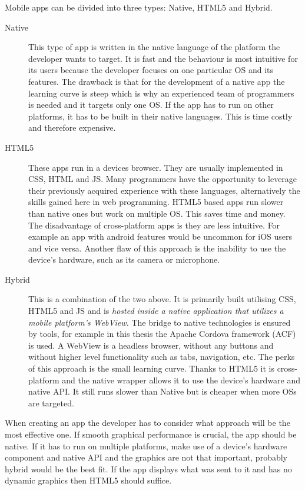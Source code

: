 Mobile apps can be divided into three types: Native, HTML5 and Hybrid.
\begin {description}
\item [Native] This type of app is written in the native language of the platform the developer wants to target. It is fast and the behaviour is most intuitive for its users because the developer focuses on one particular OS and its features. The drawback is that for the development of a native app the learning curve is steep which is why an experienced team of programmers is needed and it targets only one OS. If the app has to run on other platforms, it has to be built in their native languages. This is time costly and therefore expensive. 
\item [HTML5] These apps run in a devices browser. They are usually implemented in CSS, HTML and JS. Many programmers have the opportunity to leverage their previously acquired experience with these languages, alternatively the skills gained here in web programming. HTML5 based apps run slower than native ones but work on multiple OS. This saves time and money. The disadvantage of cross-platform apps is they are less intuitive. For example an app with android features would be uncommon for iOS users and vice versa. Another flaw of this approach is the inability to use the device's hardware, such as its camera or microphone.
\item [Hybrid] This is a combination of the two above. It is primarily built utilising CSS, HTML5 and JS and is \textit{hosted inside a native application that utilizes a mobile platform’s WebView.} \cite{hybrid-mobile-app} The bridge to native technologies is ensured by tools, for example in this thesis the Apache Cordova framework (ACF) is used. A WebView is a headless browser, without any buttons and without higher level functionality such as tabs, navigation, etc. The perks of this approach is the small learning curve. Thanks to HTML5 it is cross-platform and the native wrapper allows it to use the device's hardware and native API. It still runs slower than Native but is cheaper when more OSs are targeted.
\end{description}

When creating an app the developer has to consider what approach will be the most effective one. If smooth graphical performance is crucial, the app should be native. If it has to run on multiple platforms, make use of a device's hardware component and native API and the graphics are not that important, probably hybrid would be the best fit. If the app displays what was sent to it and has no dynamic graphics then HTML5 should suffice.

